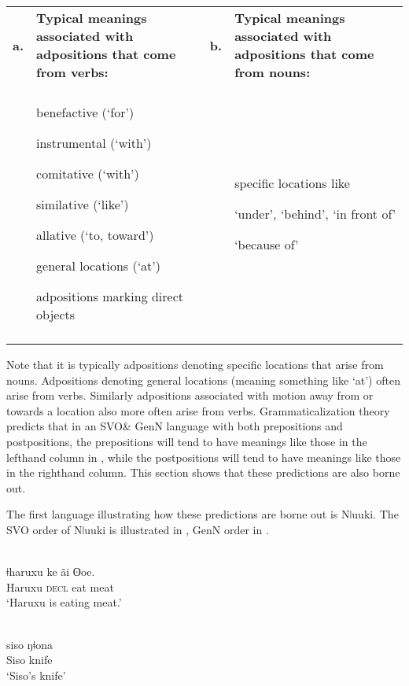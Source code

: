\documentclass[output=paper]{langsci/langscibook}
\begin{document}
\begin{table}
\begin{tabularx}{\textwidth}{lXlX}
\lsptoprule
\bfseries a. & \bfseries Typical meanings associated with  adpositions that come from verbs: & \bfseries b. & \bfseries Typical meanings associated with adpositions that come from nouns:\\
 &  &  & \\
 & {benefactive (‘for’)}

{instrumental (‘with’)}

{comitative (‘with’)}

{similative (‘like’)}

{allative (‘to, toward’)}

{general locations (‘at’)}

adpositions marking direct objects &  & {specific locations like}

{‘under’, ‘behind’, ‘in front of’}

‘because of’\\
\lspbottomrule
\end{tabularx}
\end{table}

Note that it is typically adpositions denoting specific locations that arise from nouns. Adpositions denoting general locations (meaning something like ‘at’) often arise from verbs. Similarly adpositions associated with motion away from or towards a location also more often arise from verbs. Grammaticalization theory predicts that in an SVO\& GenN language with both prepositions and postpositions, the prepositions will tend to have meanings like those in the lefthand column in , while the postpositions will tend to have meanings like those in the righthand column. This section shows that these predictions are also borne out.

The first language illustrating how these predictions are borne out is Nǀuuki. The SVO order of Nǀuuki is illustrated in , GenN order in .

\ea\label{ex:dryer:}
\\
\gll ǂharuxu    ke  ãi  ʘoe.\\
       Haruxu  \textsc{decl}  eat  meat \\
\glt ‘Haruxu is eating meat.’  
\z

\ea\label{ex:dryer:}
\\
\gll siso  ŋǂona\\
       Siso  knife\\
\glt   ‘Siso’s knife’
\z
\end{document}
